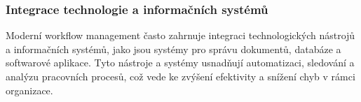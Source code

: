 \subsubsection{Integrace technologie a informačních systémů}
Moderní workflow management často zahrnuje integraci technologických nástrojů a informačních systémů, jako jsou systémy pro správu dokumentů, databáze a softwarové aplikace. Tyto nástroje a systémy usnadňují automatizaci, sledování a analýzu pracovních procesů, což vede ke zvýšení efektivity a snížení chyb v rámci organizace. \cite{muehlen_workflow-based_2004}
